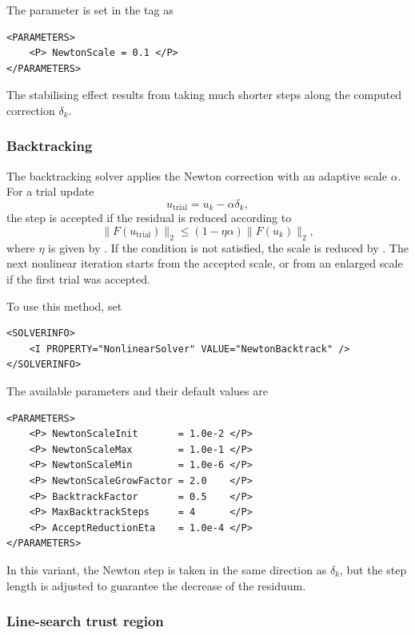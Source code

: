 The parameter is set in the  tag as
\begin{lstlisting}[style=XMLStyle]
<PARAMETERS>
    <P> NewtonScale = 0.1 </P>
</PARAMETERS>
\end{lstlisting}

The stabilising effect results from taking much shorter steps along the computed correction $\delta_k$.

\subsubsection{Backtracking}

The backtracking solver applies the Newton correction with an adaptive scale
$\alpha$. For a trial update
$$
    u_{\mathrm{trial}} = u_k - \alpha \delta_k,
$$
the step is accepted if the residual is reduced according to
$$
    \|F(u_{\mathrm{trial}})\|_2
    \leq
    \left(1 - \eta \alpha\right)\|F(u_k)\|_2,
$$
where $\eta$ is given by . If the condition is not
satisfied, the scale is reduced by . The next nonlinear
iteration starts from the accepted scale, or from an enlarged scale if the first
trial was accepted.

To use this method, set
\begin{lstlisting}[style=XMLStyle]
<SOLVERINFO>
    <I PROPERTY="NonlinearSolver" VALUE="NewtonBacktrack" />
</SOLVERINFO>
\end{lstlisting}

The available parameters and their default values are
\begin{lstlisting}[style=XMLStyle]
<PARAMETERS>
    <P> NewtonScaleInit       = 1.0e-2 </P>
    <P> NewtonScaleMax        = 1.0e-1 </P>
    <P> NewtonScaleMin        = 1.0e-6 </P>
    <P> NewtonScaleGrowFactor = 2.0    </P>
    <P> BacktrackFactor       = 0.5    </P>
    <P> MaxBacktrackSteps     = 4      </P>
    <P> AcceptReductionEta    = 1.0e-4 </P>
</PARAMETERS>
\end{lstlisting}

In this variant, the Newton step is taken in the same direction as $\delta_k$, but the step length is adjusted to guarantee the decrease of the residuum.

\subsubsection{Line-search trust region}

